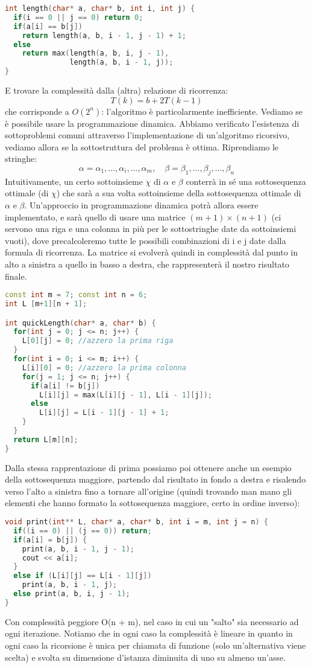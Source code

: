 \documentclass[a4paper,12pt]{article}
\begin{document}
\begin{lstlisting}[language=C++]
int length(char* a, char* b, int i, int j) {
  if(i == 0 || j == 0) return 0;
  if(a[i] == b[j])
    return length(a, b, i - 1, j - 1) + 1;
  else
    return max(length(a, b, i, j - 1), 
               length(a, b, i - 1, j));
}
\end{lstlisting}
E trovare la complessità dalla (altra) relazione di ricorrenza:
$$ T(k) = b + 2T(k - 1) $$
che corrisponde a $O(2^n)$: l'algoritmo è particolarmente inefficiente. Vediamo se è possibile usare la programmazione dinamica. Abbiamo verificato l'esistenza di sottoproblemi comuni
attraverso l'implementazione di un'algoritmo ricorsivo, vediamo allora se la sottostruttura del problema è ottima. Riprendiamo le stringhe:
$$ \alpha = \alpha_1, ..., \alpha_i, ... , \alpha_m, \quad \beta = \beta_1, ..., \beta_j, ... , \beta_n $$
Intuitivamente, un certo sottoinsieme $\chi$ di $\alpha$ e $\beta$ conterrà in sé una sottosequenza ottimale (di $\chi$) che sarà a sua volta sottoinsieme della sottosequenza ottimale di $\alpha$ e $\beta$.
Un'approccio in programmazione dinamica potrà allora essere implementato, e sarà quello di usare una matrice $(m + 1) \times (n + 1)$ (ci servono una riga e una colonna in più per le sottostringhe date da sottoinsiemi vuoti), dove precalcoleremo
tutte le possibili combinazioni di i e j date dalla formula di ricorrenza. La matrice si evolverà quindi in complessità dal punto in alto a sinistra a quello in basso a destra, che rappresenterà il nostro risultato finale.
\begin{lstlisting}[language=C++]
const int m = 7; const int n = 6;
int L [m+1][n + 1];

int quickLength(char* a, char* b) {
  for(int j = 0; j <= n; j++) {
    L[0][j] = 0; //azzero la prima riga
  }
  for(int i = 0; i <= m; i++) {
    L[i][0] = 0; //azzero la prima colonna
    for(j = 1; j <= n; j++) {
      if(a[i] != b[j])
        L[i][j] = max(L[i][j - 1], L[i - 1][j]);
      else
        L[i][j] = L[i - 1][j - 1] + 1;
    }
  }
  return L[m][n];
}
\end{lstlisting}
Dalla stessa rapprentazione di prima possiamo poi ottenere anche un esempio della sottosequenza maggiore, partendo dal risultato in fondo a destra e risalendo verso l'alto a sinistra fino a tornare all'origine (quindi trovando man mano gli elementi che hanno formato
la sottosequenza maggiore, certo in ordine inverso):
\begin{lstlisting}[language=C++]
void print(int** L, char* a, char* b, int i = m, int j = n) {
  if((i == 0) || (j == 0)) return;
  if(a[i] = b[j]) {
    print(a, b, i - 1, j - 1);
    cout << a[i];
  }
  else if (L[i][j] == L[i - 1][j])
    print(a, b, i - 1, j);
  else print(a, b, i, j - 1);
}
\end{lstlisting}
Con complessità peggiore O(n + m), nel caso in cui un "salto" sia necessario ad ogni iterazione. Notiamo che in ogni caso la complessità è lineare in quanto in ogni caso la ricorsione è unica per chiamata di funzione (solo un'alternativa viene
scelta) e svolta su dimensione d'istanza diminuita di uno su almeno un'asse.
\end{document}
